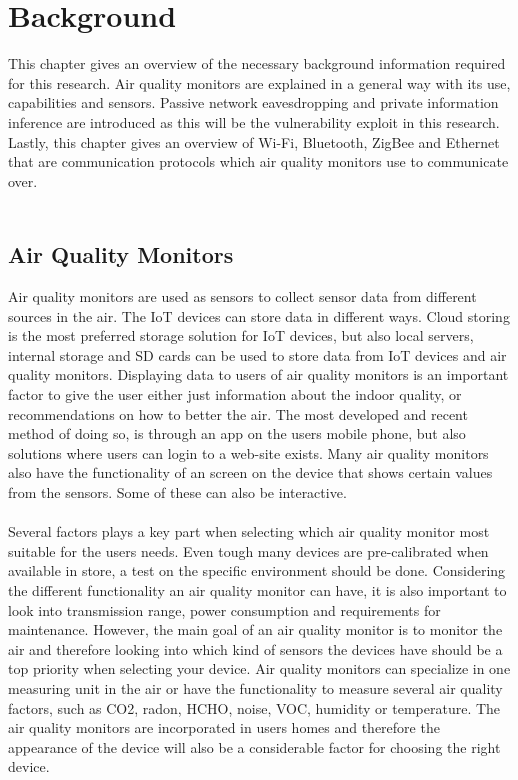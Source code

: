 \chapter*{Background}
This chapter gives an overview of the necessary background information required for this research. Air quality monitors are explained in a general way with its use, capabilities and sensors. Passive network eavesdropping and private information inference are introduced as this will be the vulnerability exploit in this research. Lastly, this chapter gives an overview of Wi-Fi, Bluetooth, ZigBee and Ethernet that are communication protocols which air quality monitors use to communicate over. \\\\
\section*{Air Quality Monitors}
Air quality monitors are used as sensors to collect sensor data from different sources in the air. \cite{GeneralAirQualityMonitor} The IoT devices can store data in different ways. Cloud storing is the most preferred storage solution for IoT devices, but also local servers, internal storage and SD cards can be used to store data from IoT devices and air quality monitors. \cite{AQMBigSource} Displaying data to users of air quality monitors is an important factor to give the user either just information about the indoor quality, or recommendations on how to better the air. \cite{AQMBigSource} The most developed and recent method of doing so, is through an app on the users mobile phone, but also solutions where users can login to a web-site exists. Many air quality monitors also have the functionality of an screen on the device that shows certain values from the sensors. Some of these can also be interactive. \cite{AQMBigSource}
\\\\
Several factors plays a key part when selecting which air quality monitor most suitable for the users needs. Even tough many devices are pre-calibrated when available in store, a test on the specific environment should be done. Considering the different functionality an air quality monitor can have, it is also important to look into transmission range, power consumption and requirements for maintenance. \cite{AQMBigSource} However, the main goal of an air quality monitor is to monitor the air and therefore looking into which kind of sensors the devices have should be a top priority when selecting your device. Air quality monitors can specialize in one measuring unit in the air or have the functionality to measure several air quality factors, such as CO2, radon, HCHO, noise, VOC, humidity or temperature. The air quality monitors are incorporated in users homes and therefore the appearance of the device will also be a considerable factor for choosing the right device. \cite{IAQMonitorCommunicationReview} 
